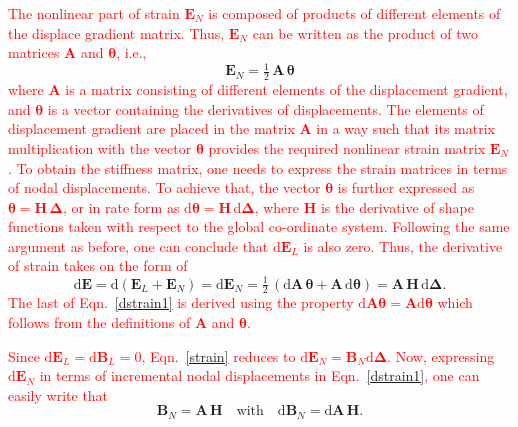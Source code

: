 \textcolor{red}{The nonlinear part of strain $\mathbf{E}_N$ is composed of products of different elements of the displace gradient matrix. Thus, $\mathbf{E}_N$ can be written as the product of two matrices $\mathbf{A}$ and $\boldsymbol{\theta}$, i.e.,} 
\begin{equation}
\mathbf{E}_N = \tfrac{1}{2} \, {\mathbf{A}} \,  \boldsymbol{\theta}
\label{nonlinstrain}
\end{equation}
\textcolor{red}{where ${\mathbf{A}}$ is a matrix consisting of different elements of the displacement gradient, and $\boldsymbol{\theta}$ is a vector containing the derivatives of displacements. The elements of displacement gradient are placed in the matrix $\mathbf{A}$ in a way such that its matrix multiplication with the vector $\boldsymbol{\theta}$ provides the required nonlinear strain matrix $\mathbf{E}_N$. To obtain the stiffness matrix, one needs to express the strain matrices in terms of nodal displacements. To achieve that, the vector $\boldsymbol{\theta}$ is further expressed as $\boldsymbol{\theta} = \mathbf{H} \, \boldsymbol{\Delta} $, or in rate form as $\mathrm{d} \boldsymbol{\theta} = \mathbf{H} \, \mathrm{d} \boldsymbol{\Delta}$, where $\mathbf{H}$ is the derivative of shape functions taken with respect to the global co-ordinate system. Following the same argument as before, one can conclude that $\mathrm{d}\mathbf{E}_L$ is also zero. Thus, the derivative of strain takes on the form of}
\begin{equation}
\mathrm{d} \mathbf{E} = \mathrm{d} (\mathbf{E}_L + \mathbf{E}_N) = \mathrm{d} \mathbf{E}_N = \tfrac{1}{2} \, (\mathrm{d} \mathbf{A} \, \boldsymbol{\theta} + \mathbf{A} \, \mathrm{d} \boldsymbol{\theta}) = \mathbf{A} \, \mathbf{H} \, \mathrm{d} \boldsymbol{\Delta} .
\label{dstrain1}
\end{equation} 
\textcolor{red}{The last of Eqn.~\eqref{dstrain1} is derived using the property $\mathrm{d}\mathbf{A}\boldsymbol{\theta}=\mathbf{A}\mathrm{d}\boldsymbol{\theta}$ which follows from the definitions of $\mathbf{A}$ and $\boldsymbol{\theta}$.}

\textcolor{red}{Since $\mathrm{d}\mathbf{E}_L=\mathrm{d}\mathbf{B}_L=0$, Eqn.~\eqref{strain} reduces to $\mathrm{d}\mathbf{E}_N=\mathbf{B}_N\mathrm{d}\boldsymbol{\Delta}$. Now, expressing $\mathrm{d}\mathbf{E}_N$ in terms of incremental nodal displacements in Eqn.~\eqref{dstrain1}, one can easily write that}
\begin{equation}
\mathbf{B}_N = \mathbf{A} \, \mathbf{H} \quad \text{with} \quad \mathrm{d} \mathbf{B}_N = \mathrm{d} \mathbf{A} \, \mathbf{H}.
\label{nonlinStrainDisp}
\end{equation} 

